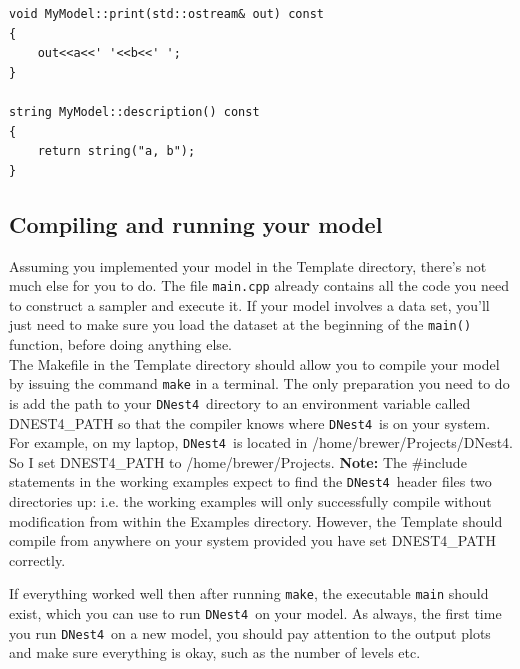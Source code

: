 \documentclass[a4paper, 11pt]{article}
\newcommand{\dnest}{{\tt DNest4}}
\begin{document}
\begin{framed}
\begin{verbatim}
void MyModel::print(std::ostream& out) const
{
    out<<a<<' '<<b<<' ';
}

string MyModel::description() const
{
    return string("a, b");
}
\end{verbatim}
\end{framed}

\subsection{Compiling and running your model}
Assuming you implemented your model in the Template directory, there's not
much else for you to do. The file {\tt main.cpp} already contains all the code
you need to construct a sampler and execute it. If your model involves a data
set, you'll just need to make sure you load the dataset at the beginning
of the {\tt main()} function, before doing anything else.\\

The Makefile in the Template directory should allow you to compile your model
by issuing the command {\tt make} in a terminal. The only preparation you need
to do is add the path to your \dnest~directory to an environment variable called
DNEST4\_PATH so that the compiler knows where \dnest~is on your system.
For example, on my laptop, \dnest~is located in /home/brewer/Projects/DNest4.
So I set DNEST4\_PATH to /home/brewer/Projects.
{\bf Note: }The \#include statements in the working examples expect to find
the \dnest~header files two directories up: i.e. the working examples will only
successfully compile without modification from within the Examples directory.
However, the Template should compile from anywhere on your system provided you
have set DNEST4\_PATH correctly.

If everything worked well then after running {\tt make},
the executable {\tt main} should exist, which you can use to run
\dnest~on your model. As always, the first time you run \dnest~on a new model,
you should pay attention to the output plots and make sure everything is okay,
such as the number of levels etc.


\end{document}
